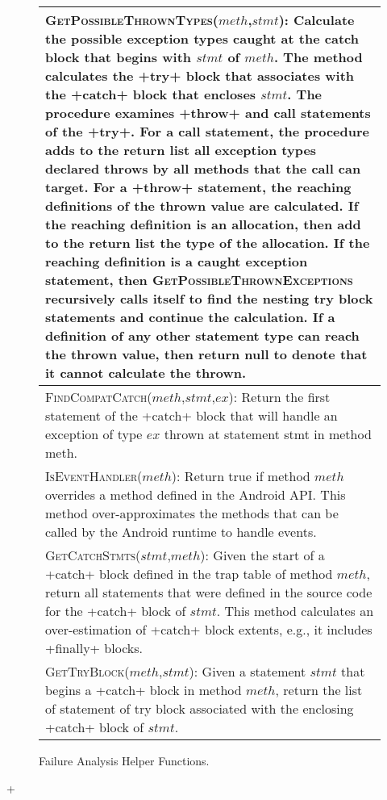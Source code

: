 \begin{figure}[t]
\scriptsize
\renewcommand*{\arraystretch}{1.3}
\begin{tabular}{|p{3.3in}|}
\hline 

\textsc{GetPossibleThrownTypes}($meth$,$stmt$): Calculate the
possible exception types caught at the catch block that begins with
$stmt$ of $meth$. The method calculates the
+try+ block that associates with the +catch+ block
that encloses $stmt$. The procedure examines +throw+
and call statements of the +try+.  For a call statement, the
procedure adds to the return list all exception types declared throws
by all methods that the call can target.  For a +throw+
statement, the reaching definitions of the thrown value are
calculated.  If the reaching definition is an allocation, then add to
the return list the type of the allocation.  If the reaching
definition is a caught exception statement, then
\textsc{GetPossibleThrownExceptions} recursively calls itself to find
the nesting try block statements and continue the calculation.  If a
definition of any other statement type can reach the thrown value,
then return null to denote that it cannot calculate the
thrown.  
\\
\hline
\textsc{FindCompatCatch}($meth$,$stmt$,$ex$): Return the first
  statement of the +catch+ block that will handle an
  exception of type $ex$ thrown at statement stmt in method meth.
\\
\hline
\textsc{IsEventHandler}($meth$): Return true if method $meth$
  overrides a method defined in the Android API.  This method
  over-approximates the methods that can be called by the Android
  runtime to handle events.
\\
\hline
\textsc{GetCatchStmts}($stmt$,$meth$): Given the start of a
+catch+ block defined in the trap table of method $meth$,
return all statements that were defined in the source code for the
+catch+ block of $stmt$.  This method calculates an
over-estimation of +catch+ block extents, e.g., it includes
+finally+ blocks.
\\
\hline
\textsc{GetTryBlock}($meth$,$stmt$): Given a statement $stmt$
  that begins a +catch+ block in method $meth$, return the
  list of statement of try block associated with the enclosing
  +catch+ block of $stmt$.
\\
\hline
\end{tabular}
\caption{\label{fig:helper-funs}Failure Analysis Helper Functions.}
\end{figure}

\lstDeleteShortInline+



